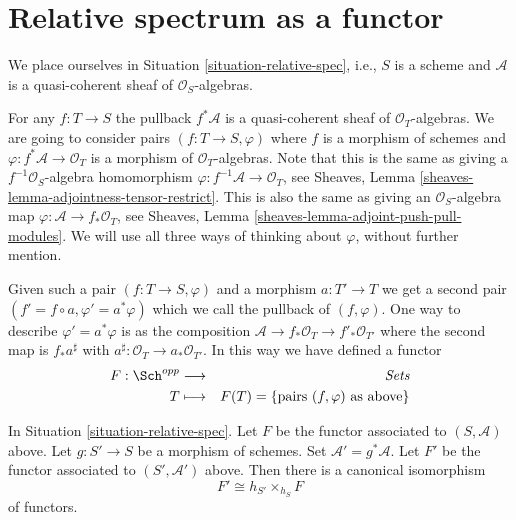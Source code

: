 \section{Relative spectrum as a functor}
\label{section-spec}

\noindent
We place ourselves in Situation \ref{situation-relative-spec}, i.e.,
$S$ is a scheme and $\mathcal{A}$ is a quasi-coherent sheaf of
$\mathcal{O}_S$-algebras.

\medskip\noindent
For any $f : T \to S$ the pullback
$f^*\mathcal{A}$ is a quasi-coherent sheaf of $\mathcal{O}_T$-algebras.
We are going to consider pairs $(f : T \to S, \varphi)$ where
$f$ is a morphism of schemes and $\varphi : f^*\mathcal{A} \to \mathcal{O}_T$
is a morphism of $\mathcal{O}_T$-algebras. Note that this is the
same as giving a $f^{-1}\mathcal{O}_S$-algebra homomorphism
$\varphi : f^{-1}\mathcal{A} \to \mathcal{O}_T$, see
Sheaves, Lemma \ref{sheaves-lemma-adjointness-tensor-restrict}.
This is also the same as giving an $\mathcal{O}_S$-algebra map
$\varphi : \mathcal{A} \to f_*\mathcal{O}_T$, see
Sheaves, Lemma \ref{sheaves-lemma-adjoint-push-pull-modules}.
We will use all three ways of thinking about $\varphi$,
without further mention.

\medskip\noindent
Given such a
pair $(f : T \to S, \varphi)$ and a morphism $a : T' \to T$ we get
a second pair $(f' = f \circ a, \varphi' = a^*\varphi)$ which we
call the pullback of $(f, \varphi)$. One way to describe
$\varphi' = a^*\varphi$ is as the composition
$\mathcal{A} \to f_*\mathcal{O}_T \to f'_*\mathcal{O}_{T'}$
where the second map is $f_*a^\sharp$ with
$a^\sharp : \mathcal{O}_T \to a_*\mathcal{O}_{T'}$.
In this way we have defined a functor
\begin{eqnarray}
\label{equation-spec}
F : \Sch^{opp} & \longrightarrow & \textit{Sets} \\
T & \longmapsto & F(T) = \{\text{pairs }(f, \varphi) \text{ as above}\}
\nonumber
\end{eqnarray}

\begin{lemma}
\label{lemma-spec-base-change}
In Situation \ref{situation-relative-spec}.
Let $F$ be the functor
associated to $(S, \mathcal{A})$ above.
Let $g : S' \to S$ be a morphism of schemes.
Set $\mathcal{A}' = g^*\mathcal{A}$. Let $F'$ be the
functor associated to $(S', \mathcal{A}')$ above.
Then there is a canonical isomorphism
$$
F' \cong h_{S'} \times_{h_S} F
$$
of functors.
\end{lemma}

